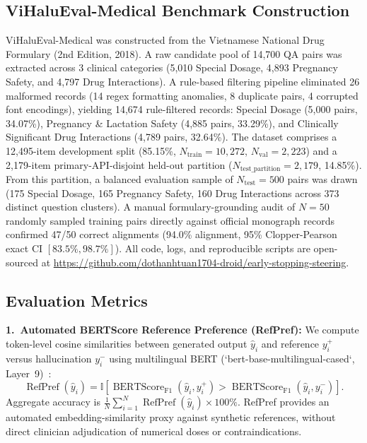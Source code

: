 \documentclass[runningheads]{llncs}
\begin{document}
\subsection{ViHaluEval-Medical Benchmark Construction}
ViHaluEval-Medical was constructed from the Vietnamese National Drug Formulary (2nd Edition, 2018). A raw candidate pool of 14,700 QA pairs was extracted across 3 clinical categories (5,010 Special Dosage, 4,893 Pregnancy Safety, and 4,797 Drug Interactions). A rule-based filtering pipeline eliminated 26 malformed records (14 regex formatting anomalies, 8 duplicate pairs, 4 corrupted font encodings), yielding 14,674 rule-filtered records: Special Dosage (5,000 pairs, 34.07\%), Pregnancy \& Lactation Safety (4,885 pairs, 33.29\%), and Clinically Significant Drug Interactions (4,789 pairs, 32.64\%). The dataset comprises a 12,495-item development split (85.15\%, $N_{\text{train}}=10{,}272$, $N_{\text{val}}=2{,}223$) and a 2,179-item primary-API-disjoint held-out partition ($N_{\text{test\_partition}}=2{,}179$, 14.85\%). From this partition, a balanced evaluation sample of $N_{\text{test}}=500$ pairs was drawn (175 Special Dosage, 165 Pregnancy Safety, 160 Drug Interactions across 373 distinct question clusters). A manual formulary-grounding audit of $N=50$ randomly sampled training pairs directly against official monograph records confirmed 47/50 correct alignments (94.0\% alignment, 95\% Clopper-Pearson exact CI $[83.5\%, 98.7\%]$). All code, logs, and reproducible scripts are open-sourced at \url{https://github.com/dothanhtuan1704-droid/early-stopping-steering}.

\subsection{Evaluation Metrics}
\textbf{1.~Automated BERTScore Reference Preference (RefPref):} We compute token-level cosine similarities between generated output $\hat{y}_i$ and reference $y_i^+$ versus hallucination $y_i^-$ using multilingual BERT (`bert-base-multilingual-cased`, Layer~9)~\cite{ref15}:
\begin{equation}
\operatorname{RefPref}(\hat{y}_i) = \mathbb{I}\left[\operatorname{BERTScore}_{\text{F1}}(\hat{y}_i, y_i^+) > \operatorname{BERTScore}_{\text{F1}}(\hat{y}_i, y_i^-)\right].
\end{equation}
Aggregate accuracy is $\frac{1}{N} \sum_{i=1}^N \operatorname{RefPref}(\hat{y}_i) \times 100\%$. RefPref provides an automated embedding-similarity proxy against synthetic references, without direct clinician adjudication of numerical doses or contraindications.
\end{document}
